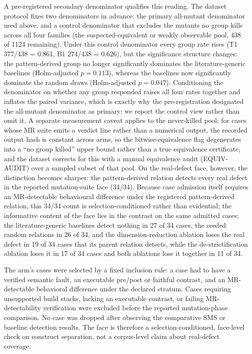 \documentclass[manuscript,screen,review]{acmart}
\begin{document}
A pre-registered secondary denominator qualifies this reading. The
dataset protocol fixes two denominators in advance: the primary
all-mutant denominator used above, and a control denominator that
excludes the mutants no group kills across all four families (the
suspected-equivalent or weakly observable pool, 438 of 1124 remaining).
Under this control denominator every group rate rises (T1 377/438 =
0.861, B1 274/438 = 0.626), but the significance structure changes: the
pattern-derived group no longer significantly dominates the
literature-generic baselines (Holm-adjusted \(p=0.113\)), whereas the
baselines now significantly dominate the random draws (Holm-adjusted
\(p=0.047\)). Conditioning the denominator on whether any group responded
raises all four rates together and inflates the paired variance, which is
exactly why the pre-registration designated the all-mutant denominator as
primary; we report the control view rather than omit it. A separate
measurement caveat applies to the never-killed pool: for cases whose MR
suite emits a verdict line rather than a numerical output, the recorded
output hash is constant across arms, so the bitwise-equivalence flag
degenerates into a ``no group killed'' upper bound rather than a true
equivalence certificate, and the dataset corrects for this with a manual
equivalence audit (EQUIV-AUDIT) over a sampled subset of that pool. On the real-defect face, however, the distinction becomes
sharper: the pattern-derived relation detects every real defect in the
reported mutation-suite face (34/34). Because case admission itself
requires an MR-detectable behavioural difference under the registered
pattern-derived relation, this 34/34 count is selection-conditioned
rather than evidential; the informative content of the face lies in the
contrast on the same admitted cases: the literature-generic baselines
detect nothing in 27 of 34 cases, the seeded random relations in 26 of
34, and the dimension-reduction ablation loses the real defect in 19 of
34 cases that its parent relation detects, while the de-strictification
ablation loses it in 17 of 34 cases and both ablations lose it together
in 11 of 34.

The arm's cases were selected by a fixed inclusion rule: a case had to have a
verified semantic fault, an executable pre/post or faithful contrast, and
an MR-detectable behavioral difference under the declared stratum.
Cases requiring unsupported build stacks, lacking an executable contrast,
or failing MR-detectability verification were excluded before the
reported mutation-phase comparison. No case was dropped after observing
the comparative SMS or baseline detection results. The face is therefore a selection-conditioned, face-level check on
construct separation, not a corpus-level claim about real-defect
coverage.
\end{document}
